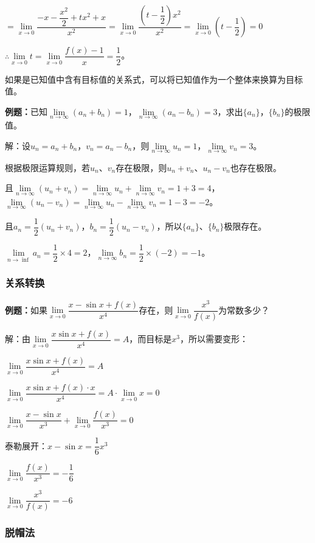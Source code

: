 $=\lim\limits_{x\to 0}\dfrac{-x-\dfrac{x^2}{2}+tx^2+x}{x^2}=\lim\limits_{x\to 0}\dfrac{\left(t-\dfrac{1}{2}\right)x^2}{x^2}=\lim\limits_{x\to 0}\left(t-\dfrac{1}{2}\right)=0$

$\therefore\lim\limits_{x\to 0}t=\lim\limits_{x\to 0}\dfrac{f(x)-1}{x}=\dfrac{1}{2}$。

如果是已知值中含有目标值的关系式，可以将已知值作为一个整体来换算为目标值。

\textbf{例题：}已知$\lim\limits_{n\to\infty}(a_n+b_n)=1$，$\lim\limits_{n\to\infty}(a_n-b_n)=3$，求出$\{a_n\}$，$\{b_n\}$的极限值。

解：设$u_n=a_n+b_n$，$v_n=a_n-b_n$，则$\lim\limits_{n\to\infty}u_n=1$，$\lim\limits_{n\to\infty}v_n=3$。

根据极限运算规则，若$u_n$、$v_n$存在极限，则$u_n+v_n$、$u_n-v_n$也存在极限。

且$\lim\limits_{n\to\infty}(u_n+v_n)=\lim\limits_{n\to\infty}u_n+\lim\limits_{n\to\infty}v_n=1+3=4$，$\lim\limits_{n\to\infty}(u_n-v_n)=\lim\limits_{n\to\infty}u_n-\lim\limits_{n\to\infty}v_n=1-3=-2$。

且$a_n=\dfrac{1}{2}(u_n+v_n)$，$b_n=\dfrac{1}{2}(u_n-v_n)$，所以$\{a_n\}$、$\{b_n\}$极限存在。

$\lim\limits_{n\to\inf}a_n=\dfrac{1}{2}\times4=2$，$\lim\limits_{n\to\infty}b_n=\dfrac{1}{2}\times(-2)=-1$。

\subsubsection{关系转换}

\textbf{例题：}如果$\lim\limits_{x\to 0}\dfrac{x-\sin x+f(x)}{x^4}$存在，则$\lim\limits_{x\to 0}\dfrac{x^3}{f(x)}$为常数多少？

解：由$\lim\limits_{x\to 0}\dfrac{x\sin x+f(x)}{x^4}=A$，而目标是$x^3$，所以需要变形：

$\lim\limits_{x\to 0}\dfrac{x\sin x+f(x)}{x^4}=A$

$\lim\limits_{x\to 0}\dfrac{x\sin x+f(x)\cdot x}{x^4}=A\cdot\lim\limits_{x\to 0}x=0$

$\lim\limits_{x\to 0}\dfrac{x-\sin x}{x^3}+\lim\limits_{x\to 0}\dfrac{f(x)}{x^3}=0$

$\text{泰勒展开：}x-\sin x=\dfrac{1}{6}x^3$

$\lim\limits_{x\to 0}\dfrac{f(x)}{x^3}=-\dfrac{1}{6}$

$\lim\limits_{x\to 0}\dfrac{x^3}{f(x)}=-6$

\subsubsection{脱帽法}

